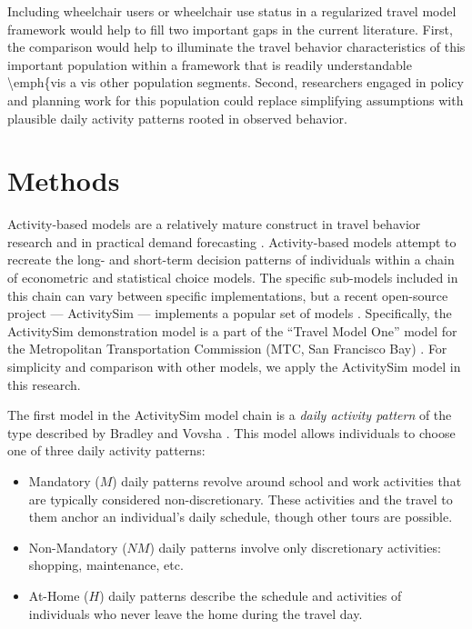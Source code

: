 \documentclass[3p, authoryear, review]{elsarticle} %
\providecommand{\tightlist}{%
  \setlength{\itemsep}{0pt}\setlength{\parskip}{0pt}}
\begin{document}
Including wheelchair users or wheelchair use status in a regularized travel model
framework would help to fill two important gaps in the current literature. First,
the comparison would help to illuminate the travel behavior characteristics of
this important population within a framework that is readily understandable
\textbackslash emph\{vis a vis other population segments. Second, researchers engaged in
policy and planning work for this population could replace simplifying assumptions
with plausible daily activity patterns rooted in observed behavior.

\hypertarget{methodology}{%
\section{Methods}\label{methodology}}

Activity-based models are a relatively mature construct in travel behavior
research and in practical demand forecasting \citet{rasouli2014activity}. Activity-based models attempt
to recreate the long- and short-term decision patterns of individuals within a
chain of econometric and statistical choice models. The specific sub-models included
in this chain can vary between specific implementations, but a recent
open-source project --- ActivitySim \citet{activitysim} --- implements a popular
set of models \citet{davidson2010ct}. Specifically, the ActivitySim demonstration
model is a part of the ``Travel Model One'' model for the Metropolitan
Transportation Commission (MTC, San Francisco Bay) \citet{erhardt2012mtc}.
For simplicity and comparison with other models, we apply the ActivitySim model
in this research.

The first model in the ActivitySim model chain is a \emph{daily activity pattern}
of the type described by Bradley and Vovsha \citet{Bradley2005}. This model
allows individuals to choose one of three daily activity patterns:

\begin{itemize}
\tightlist
\item
  Mandatory (\(M\)) daily patterns revolve around school and work activities that
  are typically considered non-discretionary. These activities and the travel
  to them anchor an individual's daily schedule, though other tours are possible.
\item
  Non-Mandatory (\(NM\)) daily patterns involve only discretionary activities:
  shopping, maintenance, etc.
\item
  At-Home (\(H\)) daily patterns describe the schedule and activities of
  individuals who never leave the home during the travel day.
\end{itemize}
\end{document}
